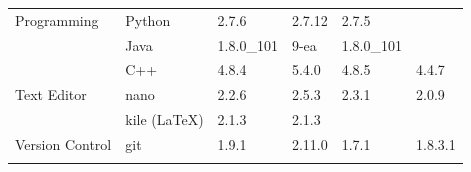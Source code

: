 \begin{table}[!ht]
{\begin{tabular}{ll|l|l|l|l|}
\cellcolor{white} Programming                                          & \multicolumn{1}{|l|}{Python}                 & 2.7.6                                                               & 2.7.12                                                            & 2.7.5                                                                  &                                                             \\ \cline{2-6}
\cellcolor{white}                                                      & \multicolumn{1}{|l|}{Java}                   & 1.8.0\_101                                                          & 9-ea                                                              & 1.8.0\_101                                                             &                                                             \\ \cline{2-6} \rowcolor{gray!25}
\cellcolor{white}                                                      & \multicolumn{1}{|l|}{C++}                    & 4.8.4                                                               & 5.4.0                                                             & 4.8.5                                                                  & 4.4.7                                                       \\ \hline
\cellcolor{white} Text Editor                                          & \multicolumn{1}{|l|}{nano}                   & 2.2.6                                                               & 2.5.3                                                             & 2.3.1                                                                  & 2.0.9                                                       \\ \cline{2-6} \rowcolor{gray!25}
\cellcolor{white}                                                      & \multicolumn{1}{|l|}{kile (\LaTeX)}          & 2.1.3                                                               & 2.1.3                                                             &                                                                        &                                                             \\ \hline
\cellcolor{white} Version Control                                      & \multicolumn{1}{|l|}{git}                    & 1.9.1                                                               & 2.11.0                                                            & 1.7.1                                                                  & 1.8.3.1                                                     \\ \hline \rowcolor{gray!25}

\end{tabular}}
\end{table}
